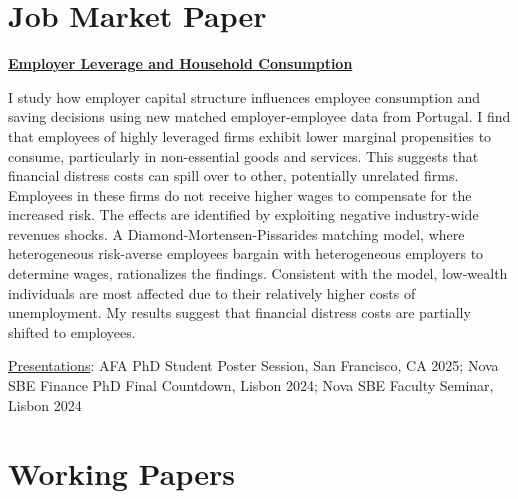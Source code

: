 \documentclass[letterpaper]{article}
\newenvironment{itemize*}{
  \begin{list}{}{
    \setlength{\leftmargin}{1.5em}
  }
}{
  \end{list}
}
\begin{document}
\section*{Job Market Paper}
\vspace{-0.2in}
\hrulefill
\begin{itemize*}
\item \href{https://papers.ssrn.com/sol3/papers.cfm?abstract_id=4784540}{\color{blue}\textbf{Employer Leverage and Household Consumption}}
\item I study how employer capital structure influences employee consumption and saving decisions using new matched employer-employee data from Portugal. I find that employees of highly leveraged firms exhibit lower marginal propensities to consume, particularly in non-essential goods and services. This suggests that financial distress costs can spill over to other, potentially unrelated firms. Employees in these firms do not receive higher wages to compensate for the increased risk. The effects are identified by exploiting negative industry-wide revenues shocks. A Diamond-Mortensen-Pissarides matching model, where heterogeneous risk-averse employees bargain with heterogeneous employers to determine wages, rationalizes the findings. Consistent with the model, low-wealth individuals are most affected due to their relatively higher costs of unemployment. My results suggest that financial distress costs are partially shifted to employees.

\underline{Presentations}: AFA PhD Student Poster Session, San Francisco, CA 2025; Nova SBE Finance PhD Final Countdown, Lisbon 2024; Nova SBE Faculty Seminar, Lisbon 2024
\end{itemize*}

\section*{Working Papers}
\vspace{-0.2in}
\hrulefill
\end{document}
